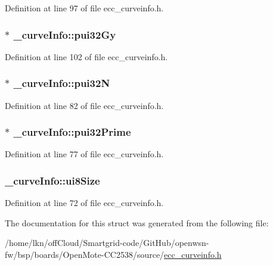 Definition at line 97 of file ecc\+\_\+curveinfo.\+h.

\subsubsection[{\texorpdfstring{pui32\+Gy}{pui32Gy}}]{$\ast$ \+\_\+curve\+Info\+::pui32\+Gy}\hypertarget{struct__curve_info_ab4de3eed70dd7148c99cff0f8f750c2f}{}\label{struct__curve_info_ab4de3eed70dd7148c99cff0f8f750c2f}


Definition at line 102 of file ecc\+\_\+curveinfo.\+h.

\subsubsection[{\texorpdfstring{pui32N}{pui32N}}]{$\ast$ \+\_\+curve\+Info\+::pui32N}\hypertarget{struct__curve_info_ae2eb1ef51fae0debe14b280274d467c3}{}\label{struct__curve_info_ae2eb1ef51fae0debe14b280274d467c3}


Definition at line 82 of file ecc\+\_\+curveinfo.\+h.

\subsubsection[{\texorpdfstring{pui32\+Prime}{pui32Prime}}]{$\ast$ \+\_\+curve\+Info\+::pui32\+Prime}\hypertarget{struct__curve_info_a888c510eef34d3e6399bf28ce28664f4}{}\label{struct__curve_info_a888c510eef34d3e6399bf28ce28664f4}


Definition at line 77 of file ecc\+\_\+curveinfo.\+h.

\subsubsection[{\texorpdfstring{ui8\+Size}{ui8Size}}]{ \+\_\+curve\+Info\+::ui8\+Size}\hypertarget{struct__curve_info_ac038a82224bff087e41f13716e48627f}{}\label{struct__curve_info_ac038a82224bff087e41f13716e48627f}


Definition at line 72 of file ecc\+\_\+curveinfo.\+h.



The documentation for this struct was generated from the following file\+:\begin{DoxyCompactItemize}
\item 
/home/lkn/off\+Cloud/\+Smartgrid-\/code/\+Git\+Hub/openwsn-\/fw/bsp/boards/\+Open\+Mote-\/\+C\+C2538/source/\hyperlink{ecc__curveinfo_8h}{ecc\+\_\+curveinfo.\+h}\end{DoxyCompactItemize}
